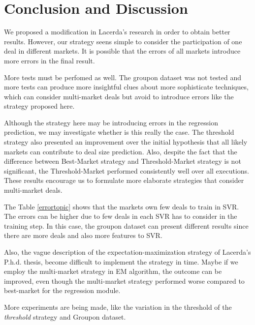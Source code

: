 \documentclass{acm_proc_article-sp}
\begin{document}
\section{Conclusion and Discussion}

We proposed a modification in Lacerda's research in order to 
obtain better results. However, our strategy seens simple 
to consider the participation of one deal in different markets. 
It is possible that the errors of all markets 
 introduce more errors in the final result. 
 
 More tests must be perfomed  as well. The groupon dataset was not 
 tested and more tests can produce more insightful clues about 
 more sophisticate techniques, which can consider multi-market deals 
 but avoid to introduce errors like the strategy proposed here. 

 Although the strategy here may be introducing errors in the 
 regression prediction, we may investigate whether is this really 
 the case. The threshold strategy also presented an improvement 
over the initial hypothesis that all likely markets can 
contribute to deal size prediction. Also, despite the fact that the difference between 
Best-Market strategy and Threshold-Market strategy is not 
significant, the Threshold-Market performed consistently well 
over all executions. These results encourage us to formulate 
more elaborate strategies that consider multi-market deals. 

The Table \ref{errortopic} shows that the markets own few 
deals to train in SVR. The errors can be higher due to 
few deals in each SVR has to consider in the training 
step. In this case, the groupon dataset can present different 
results since there are more deals and also more 
features to SVR.


Also, the vague description of the expectation-maximization strategy 
of Lacerda's P.h.d. thesis, become difficult to implement 
the strategy in time. Maybe if we employ the multi-market 
strategy in EM algorithm, the outcome can be improved, even though 
 the multi-market strategy 
performed worse compared to best-market for the regression 
module.

More experiments are being made, like the variation in the 
threshold of the \emph{threshold} strategy and Groupon dataset.
%

%
%
\end{document}
